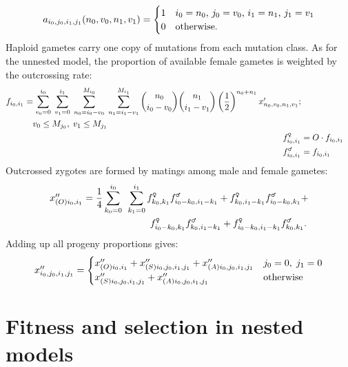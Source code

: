 \documentclass[10pt,twoside,a4paper,fleqn]{report}
\numberwithin{equation}{section}  %
\newcommand{\Mjzero}{\mbox{$M_{j_0}$\/}}
\newcommand{\Mjone}{\mbox{$M_{j_1}$\/}}
\newcommand{\gamii}{\mbox{$f_{i_0,i_1}$}}
\newcommand{\gammaleii}{\mbox{$f_{i_0,i_1}^{\text{\Male}}$}}
\newcommand{\gamfemaleii}{\mbox{$f_{i_0,i_1}^{\text{\Female}}$}}
\newcommand{\gammalekk}{\mbox{$f_{k_0,k_1}^{\text{\Male}}$}}
\newcommand{\gamfemalekk}{\mbox{$f_{k_0,k_1}^{\text{\Female}}$}}
\newcommand{\gammaleikik}{\mbox{$f_{i_0-k_0,i_1-k_1}^{\text{\Male}}$}}
\newcommand{\gamfemaleikik}{\mbox{$f_{i_0-k_0,i_1-k_1}^{\text{\Female}}$}}
\newcommand{\gammalekik}{\mbox{$f_{k_0,i_1-k_1}^{\text{\Male}}$}}
\newcommand{\gamfemalekik}{\mbox{$f_{k_0,i_1-k_1}^{\text{\Female}}$}}
\newcommand{\gammaleikk}{\mbox{$f_{i_0-k_0,k_1}^{\text{\Male}}$}}
\newcommand{\gamfemaleikk}{\mbox{$f_{i_0-k_0,k_1}^{\text{\Female}}$}}
\newcommand{\xpnvnv}{\mbox{$x'_{n_0\/,v_0\/,n_1\/,v_1\/}$}}
\newcommand{\xppsijij}{\mbox{$x''_{(S)i_0\/,j_0\/,i_1\/,j_1\/}$}}
\newcommand{\xppaijij}{\mbox{$x''_{(A)i_0\/,j_0\/,i_1\/,j_1\/}$}}
\newcommand{\xppoii}{\mbox{$x''_{(O)i_0\/,i_1\/}$}}
\newcommand{\xppijij}{\mbox{$x''_{i_0\/,j_0\/,i_1\/,j_1\/}$}}
\newcommand{\funcapomixisnested}{\mbox{$a_{i_0\/,j_0\/,i_1\/,j_1\/}(n_0\/,v_0\/,n_1\/,v_1\/)$}}
\begin{document}
{\begin{equation}
\label{eq:nested:a}
\funcapomixisnested = 
  \begin{cases}
    1 & \text{$i_0=n_0$, $j_0=v_0$, $i_1=n_1$, $j_1=v_1$} \\
    0 & \text{otherwise.}  
  \end{cases}
\end{equation}
Haploid gametes carry one copy of mutations from each mutation class.  As for the unnested model, the proportion of available female gametes is weighted by the outcrossing rate:
\begin{align}
\begin{split}
\gamii   &= \sum_{v_0=0}^{i_0}{
	  						\; \sum_{v_1=0}^{i_1}{
                	\; \sum_{n_0=i_0-v_0}^{M_{i_0}}{
                		\; \sum_{n_1=i_1-v_1}^{M_{i_1}}{
                      \binom{n_0}{i_0-v_0} \binom{n_1}{i_1-v_1}
                      \left(\frac{1}{2}\right)^{n_0+n_1} \xpnvnv 
              }}}} ; \\ 
              & \quad v_0 \le \Mjzero, \; v_1 \le \Mjone
\end{split} \\
\gamfemaleii &= O \cdot \gamii \\
\gammaleii &= \gamii
\end{align}
Outcrossed zygotes are formed by matings among male and female gametes:
\begin{equation}
\label{eq:nested:zygotes}
\begin{split}
\xppoii &= 
  \frac{1}{4}
    \sum_{k_0=0}^{i_0}{} \;
      \sum_{k_1=0}^{i_1}{}
        \gamfemalekk\gammaleikik + \gamfemalekik\gammaleikk + \\
    &   \qquad\qquad\qquad\quad \gamfemaleikk\gammalekik + \gamfemaleikik\gammalekk.
\end{split}
\end{equation}
Adding up all progeny proportions gives:
\begin{equation}
\xppijij = 
\begin{cases}
\xppoii + \xppsijij + \xppaijij  & j_0=0,\;j_1=0 \\
\xppsijij + \xppaijij            & \text{otherwise}
\end{cases}
\end{equation}

\section{Fitness and selection in nested models}

}
\end{document}
